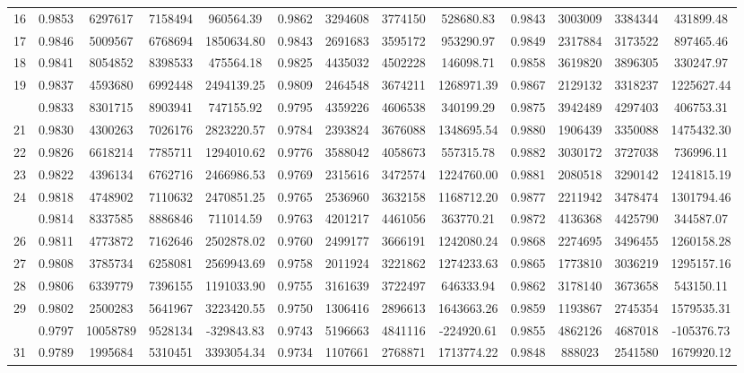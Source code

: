 \documentclass[
  12pt,
]{article}
\begin{document}
\begin{longtable}[t]{lcccccccccccc}
16 & 0.9853 & 6297617 & 7158494 & 960564.39 & 0.9862 & 3294608 & 3774150 & 528680.83 & 0.9843 & 3003009 & 3384344 & 431899.48\\
17 & 0.9846 & 5009567 & 6768694 & 1850634.80 & 0.9843 & 2691683 & 3595172 & 953290.97 & 0.9849 & 2317884 & 3173522 & 897465.46\\
18 & 0.9841 & 8054852 & 8398533 & 475564.18 & 0.9825 & 4435032 & 4502228 & 146098.71 & 0.9858 & 3619820 & 3896305 & 330247.97\\
19 & 0.9837 & 4593680 & 6992448 & 2494139.25 & 0.9809 & 2464548 & 3674211 & 1268971.39 & 0.9867 & 2129132 & 3318237 & 1225627.44\\
\addlinespace
20 & 0.9833 & 8301715 & 8903941 & 747155.92 & 0.9795 & 4359226 & 4606538 & 340199.29 & 0.9875 & 3942489 & 4297403 & 406753.31\\
21 & 0.9830 & 4300263 & 7026176 & 2823220.57 & 0.9784 & 2393824 & 3676088 & 1348695.54 & 0.9880 & 1906439 & 3350088 & 1475432.30\\
22 & 0.9826 & 6618214 & 7785711 & 1294010.62 & 0.9776 & 3588042 & 4058673 & 557315.78 & 0.9882 & 3030172 & 3727038 & 736996.11\\
23 & 0.9822 & 4396134 & 6762716 & 2466986.53 & 0.9769 & 2315616 & 3472574 & 1224760.00 & 0.9881 & 2080518 & 3290142 & 1241815.19\\
24 & 0.9818 & 4748902 & 7110632 & 2470851.25 & 0.9765 & 2536960 & 3632158 & 1168712.20 & 0.9877 & 2211942 & 3478474 & 1301794.46\\
\addlinespace
25 & 0.9814 & 8337585 & 8886846 & 711014.59 & 0.9763 & 4201217 & 4461056 & 363770.21 & 0.9872 & 4136368 & 4425790 & 344587.07\\
26 & 0.9811 & 4773872 & 7162646 & 2502878.02 & 0.9760 & 2499177 & 3666191 & 1242080.24 & 0.9868 & 2274695 & 3496455 & 1260158.28\\
27 & 0.9808 & 3785734 & 6258081 & 2569943.69 & 0.9758 & 2011924 & 3221862 & 1274233.63 & 0.9865 & 1773810 & 3036219 & 1295157.16\\
28 & 0.9806 & 6339779 & 7396155 & 1191033.90 & 0.9755 & 3161639 & 3722497 & 646333.94 & 0.9862 & 3178140 & 3673658 & 543150.11\\
29 & 0.9802 & 2500283 & 5641967 & 3223420.55 & 0.9750 & 1306416 & 2896613 & 1643663.26 & 0.9859 & 1193867 & 2745354 & 1579535.31\\
\addlinespace
30 & 0.9797 & 10058789 & 9528134 & -329843.83 & 0.9743 & 5196663 & 4841116 & -224920.61 & 0.9855 & 4862126 & 4687018 & -105376.73\\
31 & 0.9789 & 1995684 & 5310451 & 3393054.34 & 0.9734 & 1107661 & 2768871 & 1713774.22 & 0.9848 & 888023 & 2541580 & 1679920.12\\

\end{longtable}
\end{document}
